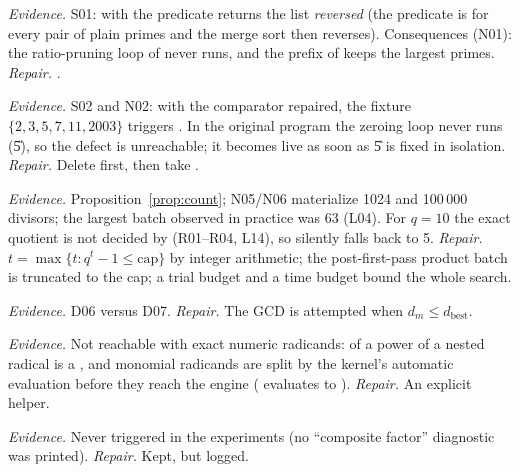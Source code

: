 \emph{Evidence.} S01:  with the predicate 
returns the list \emph{reversed} (the predicate is  for every pair
of plain primes and the merge sort then reverses). Consequences (N01): the
ratio-pruning loop of  never runs, and the prefix of
 keeps the largest primes. \emph{Repair.} .

\emph{Evidence.} S02 and N02: with the comparator repaired, the fixture
$\{2,3,5,7,11,2003\}$ triggers . In the original program the
zeroing loop never runs (\U{5}), so the defect is unreachable; it becomes live
as soon as \U{5} is fixed in isolation. \emph{Repair.} Delete first, then take
.

\emph{Evidence.} Proposition~\ref{prop:count}; N05/N06 materialize 1024 and
100\,000 divisors; the largest batch observed in practice was 63 (L04). For
$q=10$ the exact quotient  is not decided by
 (R01--R04, L14), so  silently falls back to 5.
\emph{Repair.} $t=\max\{t: q^t-1\le\text{cap}\}$ by integer arithmetic; the
post-first-pass product batch is truncated to the cap; a trial budget and a
time budget bound the whole search.

\emph{Evidence.} D06 versus D07. \emph{Repair.} The GCD is attempted when
$d_m\le d_{\text{best}}$.

\emph{Evidence.} Not reachable with exact numeric radicands:  of a
power of a nested radical is a , and monomial radicands are split by
the kernel's automatic evaluation before they reach the engine
( evaluates to ). \emph{Repair.} An
explicit  helper.

\emph{Evidence.} Never triggered in the experiments (no ``composite factor''
diagnostic was printed). \emph{Repair.} Kept, but logged.

